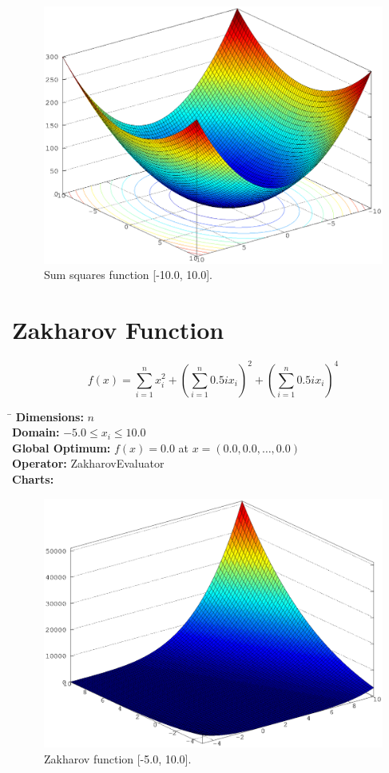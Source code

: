 \documentclass[12pt, a4paper]{article}
\begin{document}
		\begin{figure}[ht]
			\includegraphics[width=\textwidth]{Images/SumSquares}
			\caption{Sum squares function [-10.0, 10.0].}
		\end{figure}

	\newpage

	\section*{Zakharov Function}
		\begin{equation*}
			f(x)=\sum\limits_{i=1}^n x_i^2+\left(\sum\limits_{i=1}^n 0.5ix_i\right)^2+\left(\sum\limits_{i=1}^n 0.5ix_i\right)^4
		\end{equation*}

		\begin{tabbing}
			\hspace{5cm}\=\kill
			\textbf{Dimensions:}     \> $n$ \\
			\textbf{Domain:}         \> $-5.0 \leq x_i \leq 10.0$ \\
			\textbf{Global Optimum:} \> $f(x) = 0.0$ at $x = (0.0, 0.0, \dots, 0.0)$ \\
			\textbf{Operator:}       \> ZakharovEvaluator \\
			\textbf{Charts:}         \> \\
		\end{tabbing}

		\begin{figure}[ht]
			\includegraphics[width=\textwidth]{Images/Zakharov}
			\caption{Zakharov function [-5.0, 10.0].}
		\end{figure}
\end{document}
